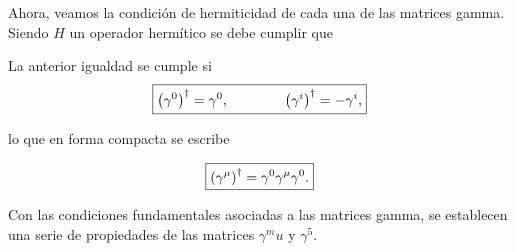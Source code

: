 Ahora, veamos la condición de hermiticidad de cada una de las matrices gamma. Siendo $H$ un operador hermítico se debe cumplir que 

La anterior igualdad se cumple si 
\begin{equation}
	 \boxed{
	\qty(\gamma^0)^\dag = \gamma^0, \qquad  \qquad \qty( \gamma^i )^\dag = - \gamma^i,}
\end{equation}

lo que en forma compacta se escribe

\begin{equation}
	\boxed{
		\qty( \gamma^\mu )^\dag = \gamma^0 \gamma^\mu \gamma^0.}
	\label{eq_4.20}
\end{equation}

Con las condiciones fundamentales asociadas a las matrices gamma, se establecen una serie de propiedades de las matrices $\gamma^mu$ y $\gamma^5$.

